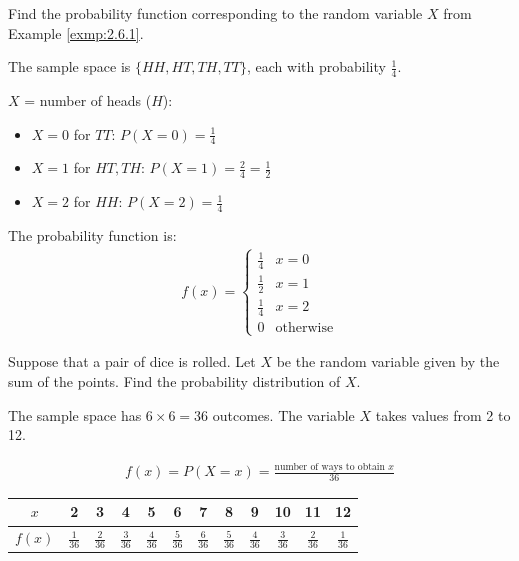 \begin{ejemplo}
	\label{exmp:2.6.2}
	Find the probability function corresponding to the random variable $X$ from Example \ref{exmp:2.6.1}.
\end{ejemplo}

\begin{solucion}
	The sample space is $\{HH, HT, TH, TT\}$, each with probability $\frac{1}{4}$.
	
	$X$ = number of heads ($H$):
	\begin{itemize}
		\item $X = 0$ for $TT$: $P(X=0) = \frac{1}{4}$
		\item $X = 1$ for $HT, TH$: $P(X=1) = \frac{2}{4} = \frac{1}{2}$
		\item $X = 2$ for $HH$: $P(X=2) = \frac{1}{4}$
	\end{itemize}
	
	The probability function is:
	\begin{align}
		f(x) = \begin{cases}
			\frac{1}{4} & x = 0 \\
			\frac{1}{2} & x = 1 \\
			\frac{1}{4} & x = 2 \\
			0 & \text{otherwise}
		\end{cases}
	\end{align}
\end{solucion}

\begin{ejemplo}
	\label{exmp:2.6.3}
	Suppose that a pair of dice is rolled. Let $X$ be the random variable given by the sum of the points. Find the probability distribution of $X.$
\end{ejemplo}

\begin{solucion}
	The sample space has $6 \times 6 = 36$ outcomes. The variable $X$ takes values from 2 to 12.
	
	\begin{align}
		f(x) = P(X=x) = \frac{\text{number of ways to obtain } x}{36}
	\end{align}
	
	\begin{center}
	\begin{tabular}{c|ccccccccccc}
		$x$ & 2 & 3 & 4 & 5 & 6 & 7 & 8 & 9 & 10 & 11 & 12 \\
		\hline
		$f(x)$ & $\frac{1}{36}$ & $\frac{2}{36}$ & $\frac{3}{36}$ & $\frac{4}{36}$ & $\frac{5}{36}$ & $\frac{6}{36}$ & $\frac{5}{36}$ & $\frac{4}{36}$ & $\frac{3}{36}$ & $\frac{2}{36}$ & $\frac{1}{36}$
	\end{tabular}
	\end{center}
\end{solucion}

